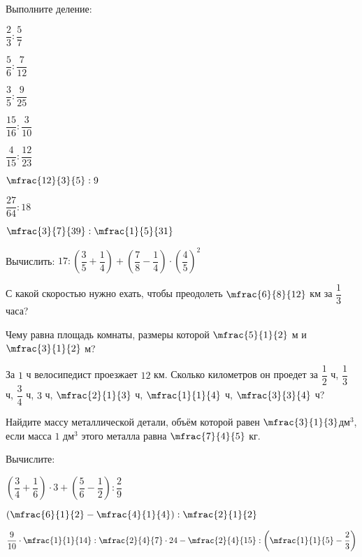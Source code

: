 %
\begin{class}[number=4]
	\begin{listofex}
		\item Выполните деление:
		\begin{enumcols}[itemcolumns=4]
			\item \( \dfrac{2}{3}:\dfrac{5}{7} \)
			\item \( \dfrac{5}{6}:\dfrac{7}{12} \)
			\item \( \dfrac{3}{5}:\dfrac{9}{25} \)
			\item \( \dfrac{15}{16}:\dfrac{3}{10} \)
			\item \( \dfrac{4}{15}:\dfrac{12}{23} \)
			\item \( \mfrac{12}{3}{5}:9 \)
			\item \( \dfrac{27}{64}:18 \)
			\item \( \mfrac{3}{7}{39}:\mfrac{1}{5}{31} \)
		\end{enumcols}
		\item Вычислить: \( 17:\left( \dfrac{3}{5}+\dfrac{1}{4} \right)+\left( \dfrac{7}{8}-\dfrac{1}{4} \right)\cdot\left( \dfrac{4}{5} \right)^2 \)
		\item С какой скоростью нужно ехать, чтобы преодолеть \( \mfrac{6}{8}{12} \) км за \( \dfrac{1}{3} \) часа?
		\item Чему равна площадь комнаты, размеры которой \( \mfrac{5}{1}{2} \) м и \( \mfrac{3}{1}{2} \) м?
		\item За \( 1 \) ч велосипедист проезжает \( 12 \) км. Сколько километров он проедет за \( \dfrac{1}{2} \) ч, \( \dfrac{1}{3} \) ч, \( \dfrac{3}{4} \) ч, \( 3 \) ч, \( \mfrac{2}{1}{3} \) ч, \( \mfrac{1}{1}{4} \) ч, \( \mfrac{3}{3}{4} \) ч?
		\item Найдите массу металлической детали, объём которой равен \( \mfrac{3}{1}{3} \)дм\( ^3 \), если масса \( 1 \) дм\( ^3\) этого металла равна \( \mfrac{7}{4}{5} \) кг.
		\item Вычислите:
		\begin{enumcols}[itemcolumns=2]
			\item \( \left( \dfrac{3}{4}+\dfrac{1}{6} \right)\cdot3+\left( \dfrac{5}{6}-\dfrac{1}{2} \right):\dfrac{2}{9} \)
			\item \( \left( \mfrac{6}{1}{2}-\mfrac{4}{1}{4} \right):\mfrac{2}{1}{2} \)
			\item \( \dfrac{9}{10}\cdot\mfrac{1}{1}{14}:\mfrac{2}{4}{7}\cdot24-\mfrac{2}{4}{15}:\left( \mfrac{1}{1}{5}-\dfrac{2}{3} \right) \)
		\end{enumcols}
	\end{listofex}
\end{class}

